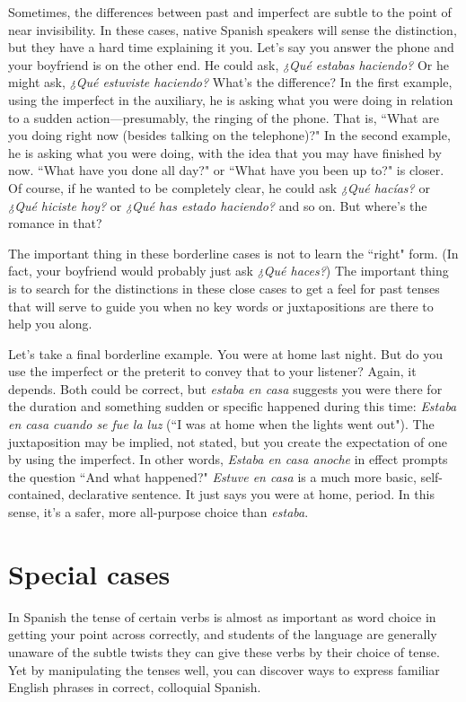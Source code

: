 Sometimes, the differences between past and imperfect are
subtle to the point of near invisibility. In these cases, native Spanish
speakers will sense the distinction, but they have a hard time explaining it you. Let's say you answer the phone and your boyfriend is on the
other end. He could ask, \emph{¿Qué estabas haciendo?} Or he might ask,
\emph{¿Qué estuviste haciendo?} What's the difference? In the first example,
using the imperfect in the auxiliary, he is asking what you were doing
in relation to a sudden action---presumably, the ringing of the phone.
That is, ``What are you doing right now (besides talking on the telephone)?" In the second example, he is asking what you were doing,
with the idea that you may have finished by now. ``What have you
done all day?" or ``What have you been up to?" is closer. Of course, if
he wanted to be completely clear, he could ask \emph{¿Qué hacías?} or \emph{¿Qué
	hiciste hoy?} or \emph{¿Qué has estado haciendo?} and so on. But where's the
romance in that?

The important thing in these borderline cases is not to learn
the ``right" form. (In fact, your boyfriend would probably just ask \emph{¿Qué
	haces?}) The important thing is to search for the distinctions in these
close cases to get a feel for past tenses that will serve to guide you
when no key words or juxtapositions are there to help you along.

Let's take a final borderline example. You were at home last
night. But do you use the imperfect or the preterit to convey that to
your listener? Again, it depends. Both could be correct, but \emph{estaba en
	casa} suggests you were there for the duration and something sudden or
specific happened during this time: \emph{Estaba en casa cuando se fue la
	luz} (``I was at home when the lights went out"). The juxtaposition may
be implied, not stated, but you create the expectation of one by using
the imperfect. In other words, \emph{Estaba en casa anoche} in effect prompts
the question ``And what happened?" \emph{Estuve en casa} is a much more
basic, self-contained, declarative sentence. It just says you were at
home, period. In this sense, it's a safer, more all-purpose choice than
\emph{estaba}.

\section{Special cases}

In Spanish the tense of certain verbs is almost as important as
word choice in getting your point across correctly, and students of the
language are generally unaware of the subtle twists they can give these
verbs by their choice of tense. Yet by manipulating the tenses well,
you can discover ways to express familiar English phrases in correct,
colloquial Spanish.

